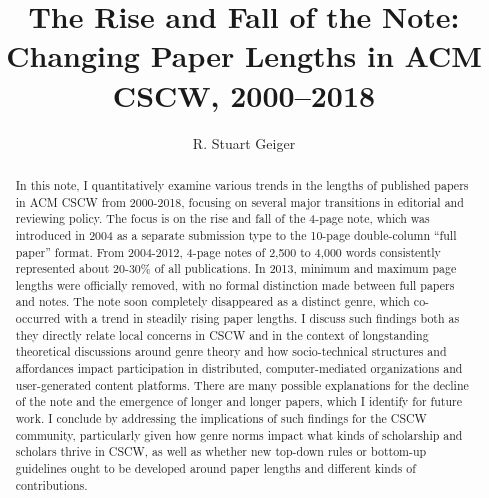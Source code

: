 \documentclass[format=acmsmall, screen=true]{acmart}
\begin{document}
%
\title{The Rise and Fall of the Note: Changing Paper Lengths in ACM CSCW, 2000--2018}


\author{R. Stuart Geiger}



%
\renewcommand{\shortauthors}{Geiger}

%
\begin{abstract}
In this note, I quantitatively examine various trends in the lengths of published papers in ACM CSCW from 2000-2018, focusing on several major transitions in editorial and reviewing policy. The focus is on the rise and fall of the 4-page note, which was introduced in 2004 as a separate submission type to the 10-page double-column ``full paper'' format. From 2004-2012, 4-page notes of 2,500 to 4,000 words consistently represented about 20-30\% of all publications. In 2013, minimum and maximum page lengths were officially removed, with no formal distinction made between full papers and notes. The note soon completely disappeared as a distinct genre, which co-occurred with a trend in steadily rising paper lengths. I discuss such findings both as they directly relate local concerns in CSCW and in the context of longstanding theoretical discussions around genre theory and how socio-technical structures and affordances impact participation in distributed, computer-mediated organizations and user-generated content platforms. There are many possible explanations for the decline of the note and the emergence of longer and longer papers, which I identify for future work. I conclude by addressing the implications of such findings for the CSCW community, particularly given how genre norms impact what kinds of scholarship and scholars thrive in CSCW, as well as whether new top-down rules or bottom-up guidelines ought to be developed around paper lengths and different kinds of contributions.
\end{abstract}
\end{document}
